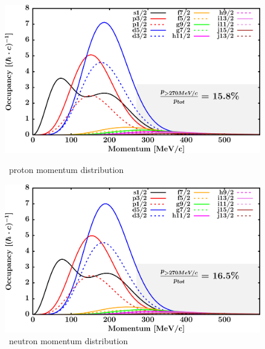 \begin{figure}[hbtp]
    \centering
    \begin{minipage}{0.45\textwidth}
        \centering
        \includegraphics[width=\textwidth]{figures/ca40_protonLJMomentumDistIntegral.png}
        \caption*{\caForty\ proton momentum distribution}
        \label{DOMFitData_ca40_proton_momentumDist}
    \end{minipage}\hspace{6pt}
    \begin{minipage}{0.45\textwidth}
        \centering
        \includegraphics[width=\textwidth]{figures/ca40_neutronLJMomentumDistIntegral.png}
        \caption*{\caForty\ neutron momentum distribution}
        \label{DOMFitData_ca40_neutron_momentumDist}
    \end{minipage}
\end{figure}
\vspace{0.3in}
